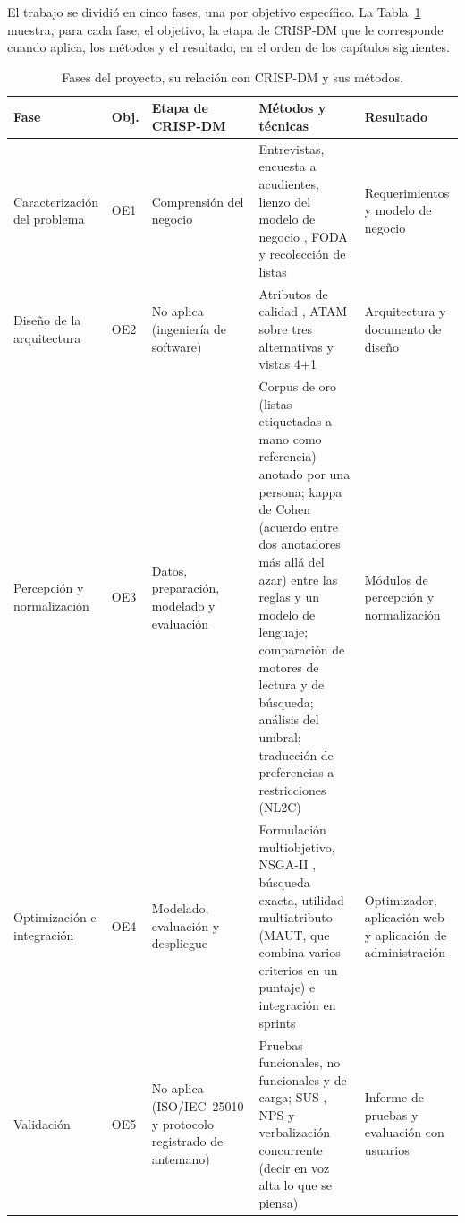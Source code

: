 El trabajo se dividió en cinco fases, una por objetivo específico. La Tabla~\ref{tab:fases} muestra, para
cada fase, el objetivo, la etapa de CRISP-DM que le corresponde cuando aplica, los métodos y el resultado, en
el orden de los capítulos siguientes.\par

\begin{table}[!htb]
\centering\footnotesize
\setlength{\tabcolsep}{4pt}
\renewcommand{\arraystretch}{1.1}
\caption{Fases del proyecto, su relación con CRISP-DM y sus métodos.}
\label{tab:fases}
\begin{tabularx}{\textwidth}{@{}p{2.3cm}p{0.8cm}p{2.4cm}Xp{2.9cm}@{}}
\toprule
Fase & Obj. & Etapa de CRISP-DM & Métodos y técnicas & Resultado \\
\midrule
Caracterización del problema & OE1 & Comprensión del negocio &
Entrevistas, encuesta a acudientes, lienzo del modelo de negocio
\citep{osterwalder_business_2010}, FODA y recolección de listas &
Requerimientos y modelo de negocio \\
Diseño de la arquitectura & OE2 & No aplica (ingeniería de software) &
Atributos de calidad \citep{richards_fundamentals_2025,iso_25010_2011}, ATAM sobre tres alternativas \citep{bass_software_2021} y vistas 4+1
\citep{kruchten_41_1995} &
Arquitectura y documento de diseño \\
Percepción y normalización & OE3 & Datos, preparación, modelado y evaluación &
Corpus de oro (listas etiquetadas a mano como referencia) anotado por una persona; kappa de Cohen
\citep{cohen_coefficient_1960} (acuerdo entre dos anotadores más allá del azar) entre las reglas y un modelo
de lenguaje; comparación de motores de lectura y de búsqueda; análisis del umbral; traducción de preferencias
a restricciones (NL2C) &
Módulos de percepción y normalización \\
Optimización e integración & OE4 & Modelado, evaluación y despliegue &
Formulación multiobjetivo, NSGA-II \citep{deb_fast_2002}, búsqueda exacta, utilidad
multiatributo (MAUT, que combina varios criterios en un puntaje) e integración en sprints &
Optimizador, aplicación web y aplicación de administración \\
Validación & OE5 & No aplica (ISO/IEC~25010 y protocolo registrado de antemano) &
Pruebas funcionales, no funcionales y de carga; SUS \citep{brooke_sus_1996}, NPS
\citep{reichheld_one_2003} y verbalización concurrente (decir en voz alta lo que se piensa)
\citep{lazar_research_2017} &
Informe de pruebas y evaluación con usuarios \\
\bottomrule
\end{tabularx}
\end{table}

